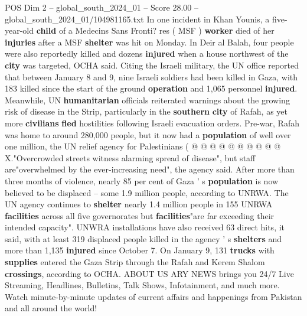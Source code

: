 \begin{textsample}{POS Dim 2 – global\_south\_2024\_01 – Score 28.00 – global\_south\_2024\_01/104981165.txt}
In one incident in Khan Younis, a five-year-old \textbf{child} of a Medecins Sans Fronti? res ( MSF ) \textbf{worker} died of her \textbf{injuries} after a MSF \textbf{shelter} was hit on Monday.
In Deir al Balah, four people were also reportedly killed and dozens \textbf{injured} when a house northwest of the \textbf{city} was targeted, OCHA said.
Citing the Israeli military, the UN office reported that between January 8 and 9, nine Israeli soldiers had been killed in Gaza, with 183 killed since the start of the ground \textbf{operation} and 1,065 personnel \textbf{injured}.
Meanwhile, UN \textbf{humanitarian} officials reiterated warnings about the growing risk of disease in the Strip, particularly in the \textbf{southern} \textbf{city} of Rafah, as yet more \textbf{civilians} \textbf{fled} hostilities following Israeli evacuation orders.
Pre-war, Rafah was home to around 280,000 people, but it now had a \textbf{population} of well over one million, the UN relief agency for Palestinians ( @ @ @ @ @ @ @ @ @ @ X."Overcrowded streets witness alarming spread of disease", but staff are"overwhelmed by the ever-increasing need", the agency said.
After more than three months of violence, nearly 85 per cent of Gaza ' s \textbf{population} is now believed to be displaced -- some 1.9 million people, according to UNRWA.
The UN agency continues to \textbf{shelter} nearly 1.4 million people in 155 UNRWA \textbf{facilities} across all five governorates but \textbf{facilities}"are far exceeding their intended capacity".
UNWRA installations have also received 63 direct hits, it said, with at least 319 displaced people killed in the agency ' s \textbf{shelters} and more than 1,135 \textbf{injured} since October 7.
On January 9, 131 \textbf{trucks} with \textbf{supplies} entered the Gaza Strip through the Rafah and Kerem Shalom \textbf{crossings}, according to OCHA.
ABOUT US ARY NEWS brings you 24/7 Live Streaming, Headlines, Bulletins, Talk Shows, Infotainment, and much more.
Watch minute-by-minute updates of current affairs and happenings from Pakistan and all around the world!

\end{textsample}
